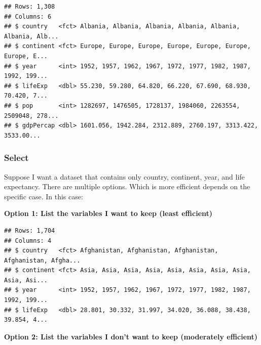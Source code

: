 \documentclass[
]{book}
\newenvironment{Shaded}{\begin{snugshade}}{\end{snugshade}}
\newcommand{\KeywordTok}[1]{\textcolor[rgb]{0.13,0.29,0.53}{\textbf{#1}}}
\newcommand{\NormalTok}[1]{#1}
\newcommand{\OperatorTok}[1]{\textcolor[rgb]{0.81,0.36,0.00}{\textbf{#1}}}
\newcommand{\StringTok}[1]{\textcolor[rgb]{0.31,0.60,0.02}{#1}}
\begin{document}
\begin{verbatim}
## Rows: 1,308
## Columns: 6
## $ country   <fct> Albania, Albania, Albania, Albania, Albania, Albania, Alb...
## $ continent <fct> Europe, Europe, Europe, Europe, Europe, Europe, Europe, E...
## $ year      <int> 1952, 1957, 1962, 1967, 1972, 1977, 1982, 1987, 1992, 199...
## $ lifeExp   <dbl> 55.230, 59.280, 64.820, 66.220, 67.690, 68.930, 70.420, 7...
## $ pop       <int> 1282697, 1476505, 1728137, 1984060, 2263554, 2509048, 278...
## $ gdpPercap <dbl> 1601.056, 1942.284, 2312.889, 2760.197, 3313.422, 3533.00...
\end{verbatim}

\hypertarget{select}{%
\subsubsection*{Select}\label{select}}

Suppose I want a dataset that contains only country, continent, year, and life expectancy. There are multiple options. Which is more efficient depends on the specific case. In this case:

\textbf{Option 1: List the variables I want to keep (least efficient)}

\begin{Shaded}
\end{Shaded}

\begin{verbatim}
## Rows: 1,704
## Columns: 4
## $ country   <fct> Afghanistan, Afghanistan, Afghanistan, Afghanistan, Afgha...
## $ continent <fct> Asia, Asia, Asia, Asia, Asia, Asia, Asia, Asia, Asia, Asi...
## $ year      <int> 1952, 1957, 1962, 1967, 1972, 1977, 1982, 1987, 1992, 199...
## $ lifeExp   <dbl> 28.801, 30.332, 31.997, 34.020, 36.088, 38.438, 39.854, 4...
\end{verbatim}

\textbf{Option 2: List the variables I don't want to keep (moderately efficient)}

\begin{Shaded}
\end{Shaded}
\end{document}

